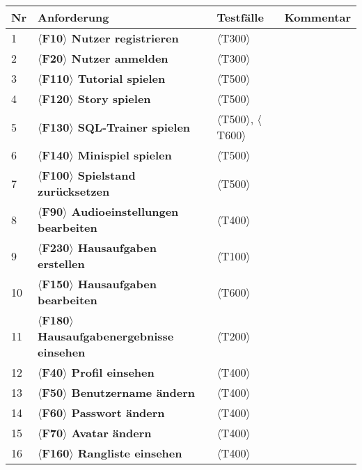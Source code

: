 \begin{center}
	\begin{longtable}{|m{}|m{}|m{}|m{}|}
		\hline
		\textbf{Nr} & \textbf{Anforderung} & \textbf{Testfälle} & \textbf{Kommentar}\\ 
		\hline
		1  & \textbf{$\langle$F10$\rangle$ Nutzer registrieren }  &  $\langle$T300$\rangle$   &     \\ 
		\hline
      2  & \textbf{$\langle$F20$\rangle$ Nutzer anmelden } &  $\langle$T300$\rangle$   &    \\ 
		\hline
		3  & \textbf{$\langle$F110$\rangle$ Tutorial spielen } &  $\langle$T500$\rangle$   &     \\ 
		\hline
		4  & \textbf{$\langle$F120$\rangle$ Story spielen } &  $\langle$T500$\rangle$   &     \\ 
		\hline
		5  & \textbf{$\langle$F130$\rangle$ SQL-Trainer spielen } &  $\langle$T500$\rangle$, $\langle$T600$\rangle$   &    \\ 
		\hline
		6  & \textbf{$\langle$F140$\rangle$ Minispiel spielen } &  $\langle$T500$\rangle$   &    \\ 
		\hline
		7  & \textbf{$\langle$F100$\rangle$ Spielstand zurücksetzen } &  $\langle$T500$\rangle$   &     \\ 
		\hline
		8  & \textbf{$\langle$F90$\rangle$ Audioeinstellungen bearbeiten } &  $\langle$T400$\rangle$   &     \\ 
		\hline
		9  & \textbf{$\langle$F230$\rangle$ Hausaufgaben erstellen } &  $\langle$T100$\rangle$   &  \\ 
		\hline
		10  & \textbf{$\langle$F150$\rangle$ Hausaufgaben bearbeiten } &  $\langle$T600$\rangle$   &     \\ 
		\hline
		11  & \textbf{$\langle$F180$\rangle$ Hausaufgabenergebnisse einsehen } &  $\langle$T200$\rangle$   &     \\ 
		\hline
		12 & \textbf{$\langle$F40$\rangle$ Profil einsehen } &  $\langle$T400$\rangle$   &     \\ 
		\hline
		13  & \textbf{$\langle$F50$\rangle$ Benutzername ändern } &  $\langle$T400$\rangle$   &     \\ 
		\hline
		14  & \textbf{$\langle$F60$\rangle$ Passwort ändern } &  $\langle$T400$\rangle$   &   \\ 
		\hline
		15  & \textbf{$\langle$F70$\rangle$ Avatar ändern } &  $\langle$T400$\rangle$   &    \\ 
		\hline
		16  & \textbf{$\langle$F160$\rangle$ Rangliste einsehen } &  $\langle$T400$\rangle$   &     \\ 

\end{longtable}
\end{center}
